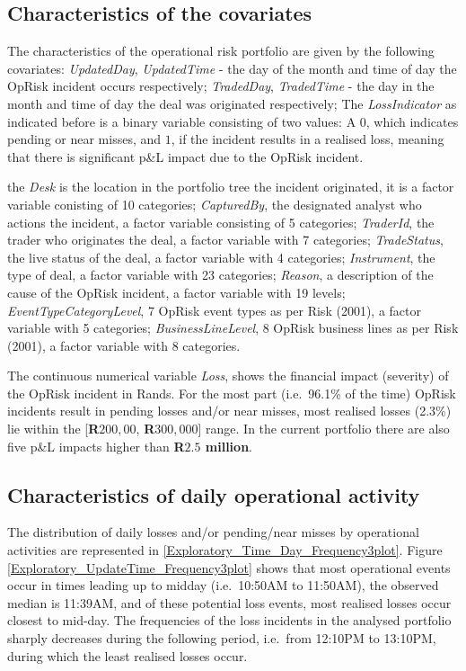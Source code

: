 \documentclass{DissertateUSU}
\begin{document}
\subsection{Characteristics of the covariates}

The characteristics of the operational risk portfolio are given by the
following covariates: \emph{UpdatedDay}, \emph{UpdatedTime} - the day of
the month and time of day the OpRisk incident occurs respectively;
\emph{TradedDay}, \emph{TradedTime} - the day in the month and time of
day the deal was originated respectively; The \emph{LossIndicator} as
indicated before is a binary variable consisting of two values: A \(0\),
which indicates pending or near misses, and \(1\), if the incident
results in a realised loss, meaning that there is significant p\&L
impact due to the OpRisk incident.\medskip

the \emph{Desk} is the location in the portfolio tree the incident
originated, it is a factor variable conisting of 10 categories;
\emph{CapturedBy}, the designated analyst who actions the incident, a
factor variable consisting of 5 categories; \emph{TraderId}, the trader
who originates the deal, a factor variable with 7 categories;
\emph{TradeStatus}, the live status of the deal, a factor variable with
4 categories; \emph{Instrument}, the type of deal, a factor variable
with 23 categories; \emph{Reason}, a description of the cause of the
OpRisk incident, a factor variable with 19 levels;
\emph{EventTypeCategoryLevel}, 7 OpRisk event types as per Risk (2001),
a factor variable with 5 categories; \emph{BusinessLineLevel}, 8 OpRisk
business lines as per Risk (2001), a factor variable with 8
categories.\medskip

\singlespacing

\doublespacing

The continuous numerical variable \emph{Loss}, shows the financial
impact (severity) of the OpRisk incident in Rands. For the most part
(i.e.~96.1\% of the time) OpRisk incidents result in pending losses
and/or near misses, most realised losses (2.3\%) lie within the
{[}\textbf{R$200,00$}, \textbf{R$300,000$}{]} range. In the current
portfolio there are also five p\&L impacts higher than
\textbf{R$2.5$ million}.\medskip

\subsection{Characteristics of daily operational activity}

The distribution of daily losses and/or pending/near misses by
operational activities are represented in
\ref{Exploratory_Time_Day_Frequency3plot}. Figure
\ref{Exploratory_UpdateTime_Frequency3plot} shows that most operational
events occur in times leading up to midday (i.e.~10:50AM to 11:50AM),
the observed median is 11:39AM, and of these potential loss events, most
realised losses occur closest to mid-day. The frequencies of the loss
incidents in the analysed portfolio sharply decreases during the
following period, i.e.~from 12:10PM to 13:10PM, during which the least
realised losses occur.\medskip
\end{document}
